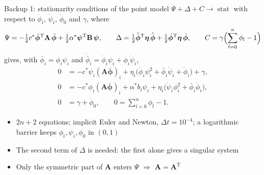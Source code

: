 \documentclass[aspectratio=169,11pt]{beamer}
\begin{document}
\begin{frame}[label=bk1]{Backup 1: stationarity conditions of the point model}
\small
$\dot\Psi+\Delta+C\to\operatorname{stat}$ with respect to $\dot\phi_i$, $\dot\psi_i$, $\dot\phi_0$ and $\gamma$, where
\[
\Psi=-\tfrac12c^*\bar{\bm\phi}^{\mathrm T}\mathbf A\,\bar{\bm\phi}
+\tfrac12\alpha^*\bm\psi^{\mathrm T}\mathbf B\,\bm\psi,\qquad
\Delta=\tfrac12\dot{\bar{\bm\phi}}^{\mathrm T}\bm\eta\,\dot{\bar{\bm\phi}}
+\tfrac12\dot{\bm\phi}^{\mathrm T}\bm\eta\,\dot{\bm\phi},\qquad
C=\gamma\Bigl(\sum_{l=0}^n\phi_l-1\Bigr)
\]
gives, with $\bar\phi_i=\phi_i\psi_i$ and $\dot{\bar\phi}_i=\dot\phi_i\psi_i+\phi_i\dot\psi_i$,
\[
\begin{aligned}
0&=-c^*\psi_i(\mathbf A\bar{\bm\phi})_i+\eta_i\bigl(\dot\phi_i\psi_i^2+\bar\phi_i\dot\psi_i+\dot\phi_i\bigr)+\gamma,\\
0&=-c^*\phi_i(\mathbf A\bar{\bm\phi})_i+\alpha^*b_i\psi_i+\eta_i\bigl(\dot\psi_i\phi_i^2+\bar\phi_i\dot\phi_i\bigr),\\
0&=\gamma+\dot\phi_0,\qquad 0=\textstyle\sum_{l=0}^n\phi_l-1 .
\end{aligned}
\]
\begin{itemize}
  \item $2n+2$ equations; implicit Euler and Newton, $\Delta t=10^{-4}$; a logarithmic
        barrier keeps $\phi_i,\psi_i,\phi_0$ in $(0,1)$
  \item The second term of $\Delta$ is needed: the first alone gives a singular system
  \item Only the symmetric part of $\mathbf A$ enters $\Psi$ $\Rightarrow$ $\mathbf A=\mathbf A^{\mathrm T}$
\end{itemize}
\end{frame}
\end{document}
